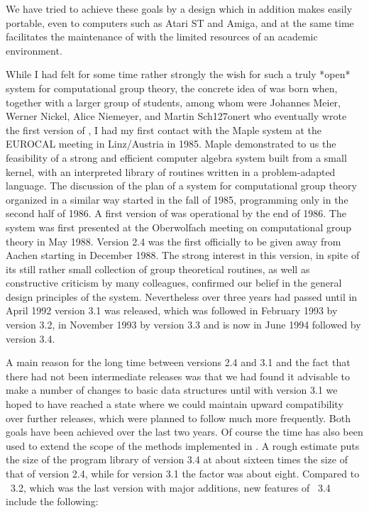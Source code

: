 We have tried  to achieve these goals by a design which in addition makes
{\GAP} easily portable, even to computers such as Atari ST and Amiga, and
at the same  time facilitates the maintenance of {\GAP} with  the limited
resources of an academic environment.

While I had felt for some time rather strongly  the wish for such a truly
*open* system for computational group theory, the concrete idea of {\GAP}
was born when, together with a larger group of  students, among whom were
Johannes   Meier,    Werner   Nickel,   Alice     Niemeyer,   and  Martin
Sch\accent127onert who eventually wrote the first  version of {\GAP}, I
had my first contact   with the Maple system   at the EUROCAL  meeting in
Linz/Austria  in  1985.  Maple demonstrated   to us the feasibility  of a
strong  and efficient computer algebra system  built from a small kernel,
with an  interpreted library of   routines written in  a  problem-adapted
language.  The discussion of the plan of a system for computational group
theory organized  in    a similar  way  started  in  the  fall  of  1985,
programming only in the second half  of 1986.  A  first version of {\GAP}
was operational by  the end of 1986.  The  system was first  presented at
the Oberwolfach meeting    on computational group   theory  in May  1988.
Version  2.4  was  the first  officially  to  be  given  away from Aachen
starting in December 1988.  The strong interest in this version, in spite
of its  still rather small  collection of group theoretical  routines, as
well  as constructive criticism  by many colleagues, confirmed our belief
in the general design principles of the  system.  Nevertheless over three
years had passed until in April 1992  version 3.1 was released, which was
followed in February 1993 by version 3.2, in November 1993 by version 3.3
and is now in June 1994 followed by version 3.4.

A main reason for the long time between versions 2.4 and 3.1 and the fact
that there had not been  intermediate releases was that  we had found  it
advisable to make a number of changes to basic data structures until with
version 3.1 we  hoped  to have reached a   state where we could  maintain
upward compatibility over further  releases, which were planned to follow
much more frequently.  Both  goals have been  achieved over the last  two
years. Of course the time has  also been used to extend  the scope of the
methods implemented in {\GAP}.   A rough estimate   puts the size  of the
program library of version 3.4 at about sixteen times the size of that of
version 2.4, while for version 3.1 the factor  was about eight.  Compared
to {\GAP}~3.2,  which  was the  last version  with  major  additions, new
features of {\GAP}~3.4 include the following:

